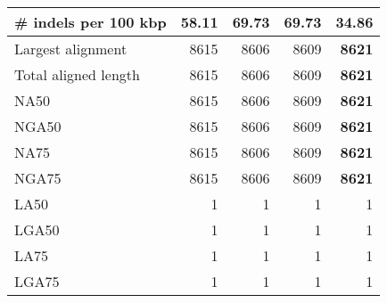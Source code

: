 \documentclass[12pt,a4paper]{article}
\begin{document}
\begin{table}[ht]
\begin{center}
\begin{tabular}{|l*{4}{|r}|}
\# indels per 100 kbp & 58.11 & 69.73 & 69.73 & {\bf 34.86} \\ \hline
Largest alignment & 8615 & 8606 & 8609 & {\bf 8621} \\ \hline
Total aligned length & 8615 & 8606 & 8609 & {\bf 8621} \\ \hline
NA50 & 8615 & 8606 & 8609 & {\bf 8621} \\ \hline
NGA50 & 8615 & 8606 & 8609 & {\bf 8621} \\ \hline
NA75 & 8615 & 8606 & 8609 & {\bf 8621} \\ \hline
NGA75 & 8615 & 8606 & 8609 & {\bf 8621} \\ \hline
LA50 & 1 & 1 & 1 & 1 \\ \hline
LGA50 & 1 & 1 & 1 & 1 \\ \hline
LA75 & 1 & 1 & 1 & 1 \\ \hline
LGA75 & 1 & 1 & 1 & 1 \\ \hline
\end{tabular}
\end{center}
\end{table}
\end{document}
